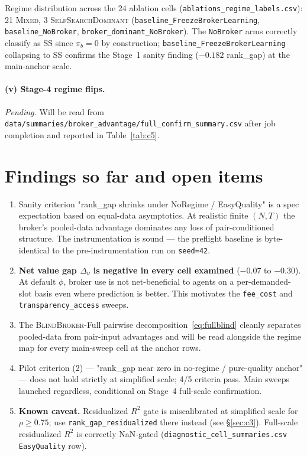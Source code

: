 \documentclass[11pt,a4paper]{article}
\begin{document}
\begin{itemize}[leftmargin=1.5em]
Regime distribution across the 24 ablation cells (\texttt{ablations\_regime\_labels.csv}): 21 \textsc{Mixed}, 3 \textsc{SelfSearchDominant} (\texttt{baseline\_FreezeBrokerLearning}, \texttt{baseline\_NoBroker}, \texttt{broker\_dominant\_NoBroker}). The \texttt{NoBroker} arms correctly classify as \textsc{SS} since $\pi_b{=}0$ by construction; \texttt{baseline\_FreezeBrokerLearning} collapsing to \textsc{SS} confirms the Stage~1 sanity finding ($-0.182$ rank\_gap) at the main-anchor scale.
\end{itemize}

\paragraph{(v) Stage-4 regime flips.} \emph{Pending.} Will be read from \texttt{data/summaries/broker\_advantage/full\_confirm\_summary.csv} after job completion and reported in Table~\ref{tab:c5}.

\section{Findings so far and open items}
\begin{enumerate}[leftmargin=2em]
\item Sanity criterion "rank\_gap shrinks under NoRegime / EasyQuality" is a spec expectation based on equal-data asymptotics. At realistic finite $(N,T)$ the broker's pooled-data advantage dominates any loss of pair-conditioned structure. The instrumentation is sound --- the preflight baseline is byte-identical to the pre-instrumentation run on \texttt{seed=42}.
\item \textbf{Net value gap $\Delta_\nu$ is negative in every cell examined} ($-0.07$ to $-0.30$). At default $\phi$, broker use is not net-beneficial to agents on a per-demanded-slot basis even where prediction is better. This motivates the \texttt{fee\_cost} and \texttt{transparency\_access} sweeps.
\item The \textsc{BlindBroker}-Full pairwise decomposition~\eqref{eq:fullblind} cleanly separates pooled-data from pair-input advantages and will be read alongside the regime map for every main-sweep cell at the anchor rows.
\item Pilot criterion (2) --- "rank\_gap near zero in no-regime / pure-quality anchor" --- does not hold strictly at simplified scale; 4/5 criteria pass. Main sweeps launched regardless, conditional on Stage~4 full-scale confirmation.
\item \textbf{Known caveat.} Residualized $R^2$ gate is miscalibrated at simplified scale for $\rho{\ge}0.75$; use \texttt{rank\_gap\_residualized} there instead (see §\ref{sec:c3}). Full-scale residualized $R^2$ is correctly NaN-gated (\texttt{diagnostic\_cell\_summaries.csv} \texttt{EasyQuality} row).
\end{enumerate}
\end{document}
